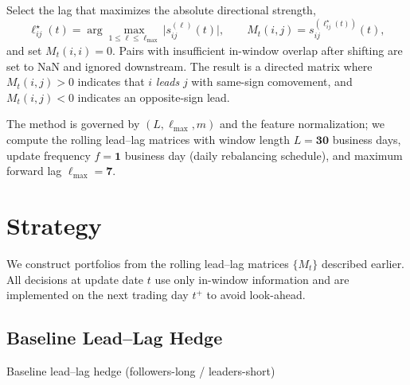 Select the lag that maximizes the absolute directional strength,
\[
\ell^\star_{ij}(t)=\arg\max_{1\le \ell\le \ell_{\max}} \big|s^{(\ell)}_{ij}(t)\big|,
\qquad
M_t(i,j)=s^{(\ell^\star_{ij}(t))}_{ij}(t),
\]
and set $M_t(i,i)=0$. Pairs with insufficient in-window overlap after shifting are set to $\mathrm{NaN}$ and ignored downstream. The result is a directed matrix where $M_t(i,j)>0$ indicates that $i$ \emph{leads} $j$ with same-sign comovement, and $M_t(i,j)<0$ indicates an opposite-sign lead.

The method is governed by $(L,\ell_{\max},m)$ and the feature normalization; we compute the rolling lead--lag matrices with
window length $L=\mathbf{30}$ business days, update frequency $f=\mathbf{1}$ business day (daily
rebalancing schedule), and maximum forward lag $\ell_{\max}=\mathbf{7}$.

\section{Strategy}\label{sec:strategy}

We construct portfolios from the rolling lead--lag matrices $\{M_t\}$ described earlier.
All decisions at update date $t$ use only in-window information and are implemented on the next trading day $t^+$ to avoid look-ahead.

\subsection{Baseline Lead--Lag Hedge}\label{sec:baseline}

\begin{algorithm}[H]
\caption{Baseline lead--lag hedge (followers-long / leaders-short)}
\label{alg:baseline2e}

\end{algorithm}


